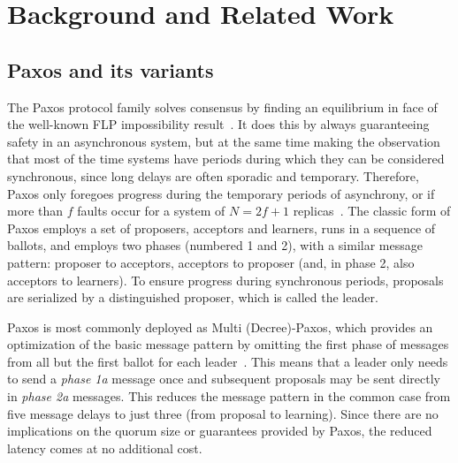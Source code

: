 \section{Background and Related Work}
\label{sec:related} 
\subsection{Paxos and its variants} \label{Paxos} 

The Paxos protocol family solves consensus by finding an equilibrium in face of the well-known FLP impossibility result~\cite{FLP85}. It does this by always guaranteeing safety in an asynchronous system, but at the same time making the observation that most of the time systems have periods during which they can be considered synchronous, since long delays are often sporadic and temporary. Therefore, Paxos only foregoes progress during the temporary periods of asynchrony, or if more than $f$ faults occur for a system of $N=2f+1$ replicas~\cite{L01}. The classic form of Paxos employs a set of proposers, acceptors and learners, runs in a sequence of ballots, and employs two phases (numbered 1 and 2), with a similar message pattern: proposer to acceptors, acceptors to proposer (and, in phase 2, also acceptors to learners). To ensure progress during synchronous periods, proposals are serialized by a distinguished proposer, which is called the leader.\par
Paxos is most commonly deployed as Multi (Decree)-Paxos, which provides an optimization of the basic message pattern by omitting the first phase of messages from all but the first ballot for each leader~\cite{Renesse2011}. This means that a leader only needs to send a \textit{phase 1a} message once and subsequent proposals may be sent directly in \textit{phase 2a} messages. This reduces the message pattern in the common case from five message delays to just three (from proposal to learning). Since there are no implications on the quorum size or guarantees provided by Paxos, the reduced latency comes at no additional cost. \par
